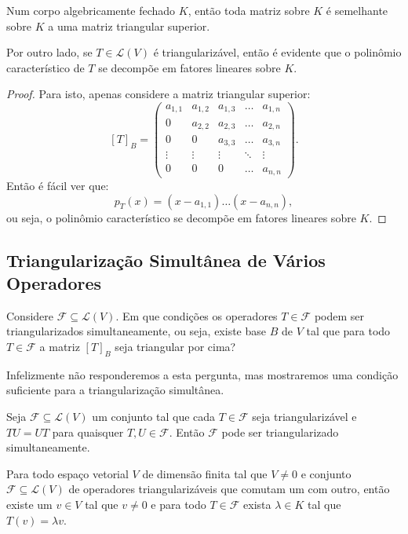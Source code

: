 \documentclass[11pt,twoside,a4paper]{book}
\begin{document}
\begin{corolario}
Num corpo algebricamente fechado $K$, então toda matriz sobre $K$ é semelhante sobre $K$ a uma matriz triangular superior.
\end{corolario}

\begin{observacao}
Por outro lado, se $T\in\mathcal{L}(V)$ é triangularizável, então é evidente que o polinômio característico de $T$ se decompõe em fatores lineares sobre $K$.
\end{observacao}
\begin{proof}
Para isto, apenas considere a matriz triangular superior:
\[
[T]_B=\begin{pmatrix}
a_{1,1}&a_{1,2}&a_{1,3}&\ldots&a_{1,n}\\0&a_{2,2}&a_{2,3}&\ldots&a_{2,n}\\0&0&a_{3,3}&\ldots&a_{3,n}\\\vdots&\vdots&\vdots&\ddots&\vdots\\0&0&0&\ldots&a_{n,n}
\end{pmatrix}.
\]
Então é fácil ver que:
\[
p_T(x)=(x-a_{1,1})\dots(x-a_{n,n}),
\]
ou seja, o polinômio característico se decompõe em fatores lineares sobre $K$.
\end{proof}

\subsection{Triangularização Simultânea de Vários Operadores}

Considere \(\mathcal{F}\subseteq\mathcal{L}(V)\). Em que condições os operadores \(T\in\mathcal{F}\) podem ser triangularizados simultaneamente, ou seja, existe base $B$ de $V$ tal que para todo $T\in\mathcal{F}$ a matriz $[T]_B$ seja triangular por cima?

\medskip
\noindent
Infelizmente não responderemos a esta pergunta, mas mostraremos uma condição suficiente para a triangularização simultânea.

\begin{teorema}
Seja \(\mathcal{F}\subseteq\mathcal{L}(V)\) um conjunto tal que cada $T\in\mathcal{F}$ seja triangularizável e \(TU=UT\) para quaisquer \(T,U\in\mathcal{F}\). Então $\mathcal{F}$ pode ser triangularizado simultaneamente.
\end{teorema}

\begin{lema}
Para todo espaço vetorial $V$ de dimensão finita tal que $V\neq 0$ e conjunto $\mathcal{F}\subseteq\mathcal{L}(V)$ de operadores triangularizáveis que comutam um com outro, então existe um $v\in V$ tal que $v\neq 0$ e para todo $T\in\mathcal{F}$ exista $\lambda\in K$ tal que $T(v)=\lambda v$.
\end{lema}
\end{document}
